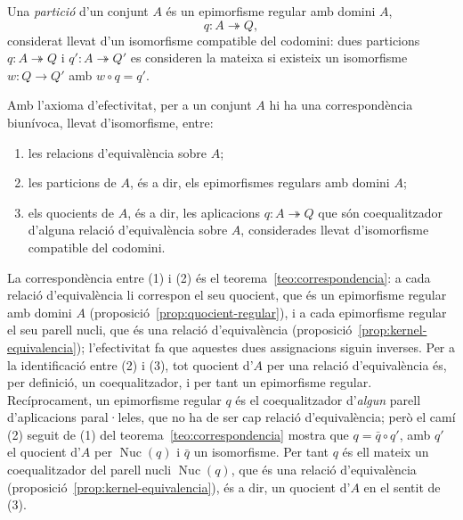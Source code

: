 \begin{definicio}[Partició]\label{def:particio}
Una \emph{partició} d'un conjunt \(A\) és un epimorfisme regular amb domini \(A\),
\[
q\colon A\twoheadrightarrow Q,
\]
considerat llevat d'un isomorfisme compatible del codomini: dues particions \(q\colon A\twoheadrightarrow Q\) i \(q'\colon A\twoheadrightarrow Q'\) es consideren la mateixa si existeix un isomorfisme \(w\colon Q\to Q'\) amb \(w\circ q=q'\).
\end{definicio}

\begin{teorema}\label{teo:triangle}
Amb l'axioma d'efectivitat, per a un conjunt \(A\) hi ha una correspondència biunívoca, llevat d'isomorfisme, entre:
\begin{enumerate}
\item les relacions d'equivalència sobre \(A\);
\item les particions de \(A\), és a dir, els epimorfismes regulars amb domini \(A\);
\item els quocients de \(A\), és a dir, les aplicacions \(q\colon A\twoheadrightarrow Q\) que són coequalitzador d'alguna relació d'equivalència sobre \(A\), considerades llevat d'isomorfisme compatible del codomini.
\end{enumerate}
\end{teorema}

\begin{prova}
La correspondència entre (1) i (2) és el teorema~\ref{teo:correspondencia}: a cada relació d'equivalència li correspon el seu quocient, que és un epimorfisme regular amb domini \(A\) (proposició~\ref{prop:quocient-regular}), i a cada epimorfisme regular el seu parell nucli, que és una relació d'equivalència (proposició~\ref{prop:kernel-equivalencia}); l'efectivitat fa que aquestes dues assignacions siguin inverses. Per a la identificació entre (2) i (3), tot quocient d'\(A\) per una relació d'equivalència és, per definició, un coequalitzador, i per tant un epimorfisme regular. Recíprocament, un epimorfisme regular \(q\) és el coequalitzador d'\emph{algun} parell d'aplicacions paral·leles, que no ha de ser cap relació d'equivalència; però el camí (2) seguit de (1) del teorema~\ref{teo:correspondencia} mostra que \(q=\bar q\circ q'\), amb \(q'\) el quocient d'\(A\) per \(\operatorname{Nuc}(q)\) i \(\bar q\) un isomorfisme. Per tant \(q\) és ell mateix un coequalitzador del parell nucli \(\operatorname{Nuc}(q)\), que és una relació d'equivalència (proposició~\ref{prop:kernel-equivalencia}), és a dir, un quocient d'\(A\) en el sentit de (3).
\end{prova}

